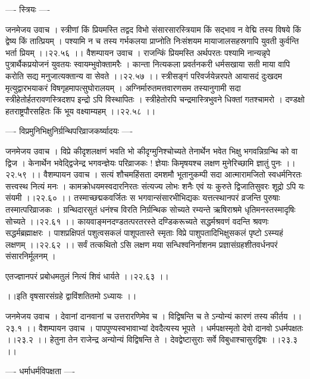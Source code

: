 \documentclass[11pt]{book}
\begin{document}
\begin{landscape}
---- स्त्रियः ----

जनमेजय उवाच ।
स्त्रीणां किं प्रियमस्ति तद्वद विभो संसारसारस्त्रियाम
किं सद्भाव न वेद्मि तस्य विषये किं द्वेष्य किं तात्प्रियम् ।
पश्यामि न च तस्य गर्भकलया प्राप्नोति निःसंशयम
मायाजालसहस्रगापि युवती कुर्वन्ति भर्ता प्रियम् ।।२२.५६ ।।
वैशम्पायन उवाच ।
राजन्किं प्रियमस्ति अर्थपरतः पश्यामि नान्यन्नृपे
पुत्रार्थैकप्रयोजनं युवतयः स्वायम्भुवोक्तामरैः ।
कान्ता नित्यकला प्रवर्तनकरी धर्मसखाया सती
माया वापि करोति सद्य मनुजात्यक्तान्य वा सेवते ।।२२.५७ ।।
स्त्रीसङ्गं परिवर्जयेन्नरपते आयासदं दुःखदम
मृत्युद्वारभयाकरं विषगृहमापत्सुघोरालयम् ।
अग्निर्मारुतमत्तवारणसम तस्यानुगामी सदा
स्त्रीहेतोर्हतरावणस्त्रिदशप इन्द्रो ऽपि विस्थापितः ।
स्त्रीहेतोरपि चन्द्रमास्त्रिभुवने धिक्तां गतश्चामरो ।
दण्डक्षो हतराष्ट्रपौरसहितः किं भूय वक्ष्याम्यहम् ।।२२.५८ ।।

---- विप्रमुनिभिक्षुनिर्ग्रन्थिपरिव्राजकर्ष्यादयः ----

जनमेजय उवाच ।
विप्रे कीदृशलक्षणं भवति भो कीदृग्मुनिश्चोच्यते
तेनार्थेन भवेत भिक्षु भगवन्निग्रन्थि को वा द्विज ।
केनार्थेन भवेद्द्विजेन्द्र भगवन्ज्ञेयः परिव्राजकः
! ज्ञेयाः किमृषयश्च लक्षण मुनेरिच्छामि ज्ञातुं पुनः ।।२२.५९ ।।
वैशम्पायन उवाच ।
सत्यं शौचमहिंसता दमशमौ भूतानुकम्पी सदा
आत्मारामजितो स्वधर्मनिरतः सत्त्वस्थ नित्यं मनः ।
कामक्रोधयमस्वदारनिरतः संत्यज्य लोभः शनैः
एवं यः कुरुते द्विजातिसुवरः शूद्रो ऽपि यः संयमी ।।२२.६० ।।
तस्माच्छद्मकवर्जितः स भगवान्संसारभीभिद्यकः
यत्तत्स्थानपरं व्रजन्ति पुरुषाः तस्मात्परिव्राजकः ।
ग्रन्थिदारसुतं धनंश्च विरति निर्ग्रन्थिक सोच्यते
रम्यन्ते ऋषिराश्रमे धृतिमनस्तस्मादृषिः सोच्यते ।।२२.६१ ।।
कायवाङ्मनदण्डतत्परतरस्ते दण्डिकरूच्यते
सद्धर्मश्रवणं वदन्ति श्रवणः सद्धर्मब्रह्माक्षरः ।
पाशप्रक्षिपतं पशुत्वसकलं पाशूपतास्ते स्मृताः
विप्रे पाशुपतादिभिक्षुसकलं पृष्टो ऽस्म्यहं लक्षणम् ।।२२.६२ ।।
सर्वं तत्कथितो ऽसि लक्षण मया सन्धिश्वनिर्नाशनम
प्रज्ञासंग्रहशीतवर्धनपरं संसारनिर्मूलनम् ।
 
एतज्ज्ञानपरं प्रबोधमतुलं नित्यं शिवं धार्यते ।।२२.६३ ।।

 ।।इति वृषसारसंग्रहे द्वाविंशतितमो ऽध्यायः ।।




जनमेजय उवाच ।
देवानां दानवानां च उत्तरारणिमेव च ।
विद्विषन्ति च ते ऽन्योन्यं कारणं तस्य कीर्तय ।।२३.१ ।।
वैशम्पायन उवाच ।
पापपुण्यस्वभावाभ्यां देवदैत्यस्य भूपते ।
धर्मपक्षस्मृतो देवो दानवो ऽधर्मपक्षतः ।।२३.२ ।।
हेतुना तेन राजेन्द्र अन्योन्यं विद्विषन्ति ते ।
देवद्वेष्टासुराः सर्वे विबुधाश्चासुरद्विषः ।।२३.३ ।।

---- धर्माधर्मविपक्षता ----


\end{landscape}
\end{document}
